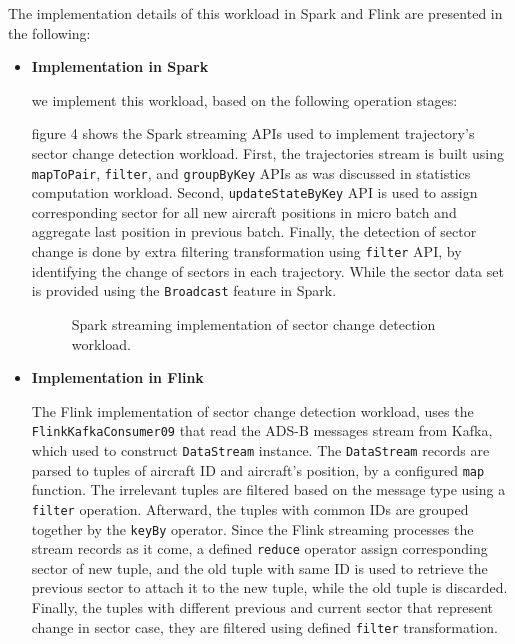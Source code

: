 \documentclass[]{article}
\begin{document}
 The implementation details of this workload in Spark and Flink are presented in the following: 
 \begin{itemize}
 \item {\bf{Implementation in Spark }}
 
 we implement this workload, based on the following operation stages: 
 
 figure 4 shows the Spark streaming APIs used to implement trajectory's sector change detection workload. First, the trajectories stream is built using \texttt{mapToPair}, \texttt{filter}, and \texttt{groupByKey} APIs as was discussed in statistics computation workload. Second,  \texttt{updateStateByKey} API is used to assign corresponding sector for all new aircraft positions in  micro batch  and aggregate last position in previous batch. Finally, the detection of sector change is done by extra filtering transformation using \texttt{filter} API, by identifying the change of sectors in each trajectory. While the sector data set is provided using the \texttt{Broadcast} feature in Spark.
 \begin{figure}[h]
  
   \centering
   
      \caption{Spark streaming implementation of sector change detection workload.}
 \end{figure} 
 
  
 \item {\bf{Implementation in Flink }}
 
 The Flink implementation of sector change detection workload, uses the \texttt{FlinkKafkaConsumer09} that read the ADS-B messages stream from Kafka, which used to construct \texttt{DataStream} instance. The \texttt{DataStream} records are parsed to tuples of aircraft ID and aircraft's position, by a configured \texttt{map} function. The irrelevant tuples are filtered based on the message type using a \texttt{filter} operation. Afterward, the tuples with common IDs are grouped together by the \texttt{keyBy} operator. Since the Flink streaming processes the stream records as it come, a defined \texttt{reduce} operator assign corresponding sector of new tuple, and the old tuple with same ID is used to retrieve the previous sector to attach it to the new tuple, while the old tuple is discarded. Finally, the tuples with different previous and current sector that represent change in sector case, they are filtered using defined \texttt{filter} transformation.
 \end{itemize}
\end{document}
